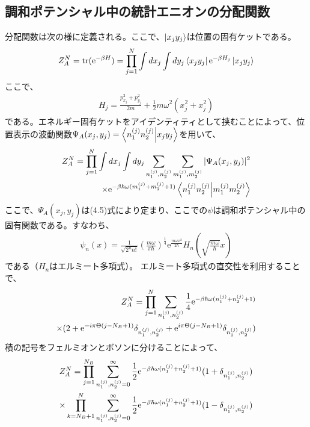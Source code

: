 \documentclass[a4paper,11pt]{jsarticle}
\numberwithin{equation}{section}
\begin{document}
\subsection{調和ポテンシャル中の統計エニオンの分配関数}
  分配関数は次の様に定義される。ここで、$\ket{x_jy_j}$は位置の固有ケットである。
  \begin{align}
  Z_A^N=\mathrm{tr}{(\mathrm{e}^{-\beta H})}=\prod_{j=1}^N\int dx_j\int dy_j \bra{x_jy_j}\mathrm{e}^{-\beta H_j}\ket{x_j y_j}
  \end{align}
  ここで、
  \begin{align}
  H_j=\frac{p_{x_j}^2+p_{y_j}^2}{2m}+\frac{1}{2}m\omega^2(x_j^2+x_j^2)
  \end{align}
  である。エネルギー固有ケットをアイデンティティとして挟むことによって、位置表示の波動関数$\Psi_A(x_j,y_j)=\braket{n_1^{(j)}n_2^{(j)}}{x_jy_j}$を用いて、
  \begin{align}
  Z_A^N=\prod_{j=1}^N\int dx_j\int dy_j \sum _{n_1^{(j)},n_2^{(j)}} \sum _{m_1^{(j)},m_2^{(j)}} |\Psi_A(x_j,y_j)|^2 \\
  \times \mathrm{e}^{-\beta\hbar\omega(m_1^{(j)}+m_2^{(j)}+1)}\braket{n_1^{(j)}n_2^{(j)}}{m_1^{(j)}m_2^{(j)}} \notag 
  \end{align}
ここで、$\Psi_A(x_j,y_j)$は(4.5)式により定まり、ここでの$\psi$は調和ポテンシャル中の固有関数である。すなわち、
\begin{align}
\psi_n(x)=\frac{1}{\sqrt{2^n n!}}\left(\frac{m\omega}{\pi\hbar}\right)^{\frac{1}{4}}\mathrm{e}^{\frac{m\omega x^2}{2\hbar}}H_n\left(\sqrt{\frac{m\omega}{\hbar}}x\right)  
\end{align}
である（$H_n$はエルミート多項式）。
エルミート多項式の直交性を利用することで、
\begin{align}
  Z_A^N=\prod_{j=1}^N \sum _{n_1^{(j)},n_2^{(j)}} \frac{1}{4}\mathrm{e}^{-\beta\hbar\omega(n_1^{(j)}+n_2^{(j)}+1)} \notag \\
  \times (2+\mathrm{e}^{-i\pi\Theta(j-N_B+1)}\delta_{n_1^{(j)},n_2^{(j)}}+\mathrm{e}^{i\pi\Theta (j-N_B+1)}\delta_{n_1^{(j)},n_2^{(j)}})  
\end{align}
積の記号をフェルミオンとボソンに分けることによって、
\begin{align}
  Z_A^N=\prod_{j=1}^{N_B}\sum_{n_1^{(j)},n_2^{(j)}=0}^{\infty}\frac{1}{2}\mathrm{e}^{-\beta\hbar\omega(n_1^{(j)}+n_2^{(j)}+1)}(1+\delta_{n_1^{(j)},n_2^{(j)}})\notag\\
  \times\prod_{k=N_B+1}^{N}\sum_{n_1^{(j)},n_2^{(j)}=0}^{\infty}\frac{1}{2}\mathrm{e}^{-\beta\hbar\omega(n_1^{(j)}+n_2^{(j)}+1)}(1-\delta_{n_1^{(j)},n_2^{(j)}})
\end{align}
\end{document}
